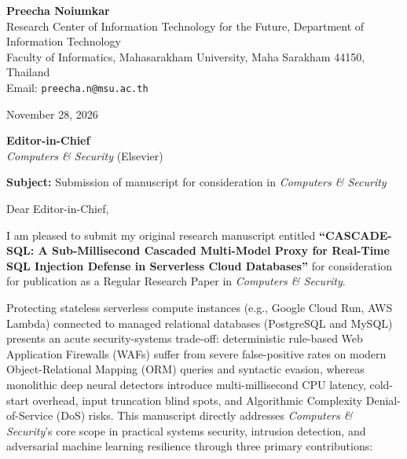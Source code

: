 \documentclass[11pt,a4paper]{article}
\begin{document}
\noindent
\textbf{Preecha Noiumkar}\\
Research Center of Information Technology for the Future, Department of Information Technology\\
Faculty of Informatics, Mahasarakham University, Maha Sarakham 44150, Thailand\\
Email: \texttt{preecha.n@msu.ac.th}

\vspace{0.8em}
\noindent November 28, 2026

\vspace{0.8em}
\noindent
\textbf{Editor-in-Chief}\\
\textit{Computers \& Security} (Elsevier)

\vspace{0.8em}
\noindent
\textbf{Subject:} Submission of manuscript for consideration in \textit{Computers \& Security}

\vspace{0.8em}
\noindent Dear Editor-in-Chief,

I am pleased to submit my original research manuscript entitled \textbf{``CASCADE-SQL: A Sub-Millisecond Cascaded Multi-Model Proxy for Real-Time SQL Injection Defense in Serverless Cloud Databases''} for consideration for publication as a Regular Research Paper in \textit{Computers \& Security}.

Protecting stateless serverless compute instances (e.g., Google Cloud Run, AWS Lambda) connected to managed relational databases (PostgreSQL and MySQL) presents an acute security-systems trade-off: deterministic rule-based Web Application Firewalls (WAFs) suffer from severe false-positive rates on modern Object-Relational Mapping (ORM) queries and syntactic evasion, whereas monolithic deep neural detectors introduce multi-millisecond CPU latency, cold-start overhead, input truncation blind spots, and Algorithmic Complexity Denial-of-Service (DoS) risks. This manuscript directly addresses \textit{Computers \& Security}'s core scope in practical systems security, intrusion detection, and adversarial machine learning resilience through three primary contributions:
\end{document}
